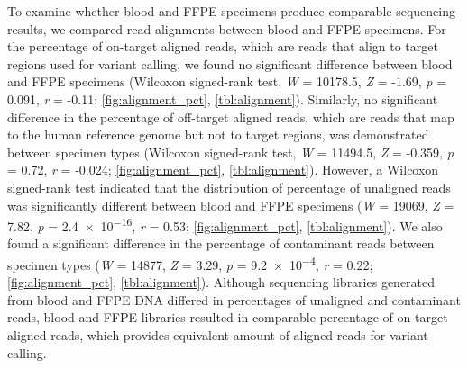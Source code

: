 To examine whether blood and FFPE specimens produce comparable sequencing results, we compared read alignments between blood and FFPE specimens. For the percentage of on-target aligned reads, which are reads that align to target regions used for variant calling, we found no significant difference between blood and FFPE specimens (Wilcoxon signed-rank test, \textit{W} = \num{10178.5}, \textit{Z} = -1.69, \textit{p} = \num{0.091}, \textit{r} = -0.11; \autoref{fig:alignment_pct}, \autoref{tbl:alignment}). Similarly, no significant difference in the percentage of off-target aligned reads, which are reads that map to the human reference genome but not to target regions, was demonstrated between specimen types (Wilcoxon signed-rank test, \textit{W} = \num{11494.5}, \textit{Z} = -0.359, \textit{p} = \num{0.72}, \textit{r} = -0.024; \autoref{fig:alignment_pct}, \autoref{tbl:alignment}). However, a Wilcoxon signed-rank test indicated that the distribution of percentage of unaligned reads was significantly different between blood and FFPE specimens (\textit{W} = \num{19069}, \textit{Z} = 7.82, \textit{p} = \num{2.4e-16}, \textit{r} = 0.53; \autoref{fig:alignment_pct}, \autoref{tbl:alignment}). We also found a significant difference in the percentage of contaminant reads between specimen types (\textit{W} = \num{14877}, \textit{Z} = 3.29, \textit{p} = \num{9.2e-4}, \textit{r} = 0.22; \autoref{fig:alignment_pct}, \autoref{tbl:alignment}). Although sequencing libraries generated from blood and FFPE DNA differed in percentages of unaligned and contaminant reads, blood and FFPE libraries resulted in comparable percentage of on-target aligned reads, which provides equivalent amount of aligned reads for variant calling.

